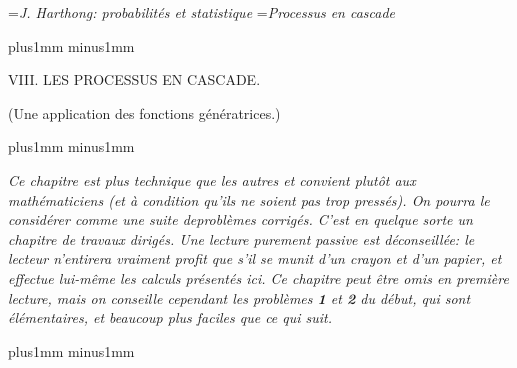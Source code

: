 


\auteurcourant={\sl J. Harthong: probabilit\'es et statistique}
\titrecourant={\sl Processus en cascade}


\def\hfq{\hfill\quad}
\def\cc#1{\hfill#1\quad\hfill}
\def\tv{\vrule height 30pt depth 6pt width0.4pt}
\def\punkt{\vrule height0.4pt depth0pt width0.4pt}
\def\L{{\bb L}} 

\def\ara{\hskip-1.5pt}
\def\asa{\hskip-2pt}
\def\ata{\hskip-2.5pt}
\def\aua{\hskip-1pt}
\def\arb{\hskip1.5pt}
\def\asb{\hskip2pt}
\def\atb{\hskip2.5pt}
\def\aub{\hskip1pt}
\def\xsp{\hskip3pt plus3pt minus2pt} 

\null\vskip 10mm plus1mm minus1mm

\centerline {\tit VIII. LES PROCESSUS EN CASCADE.} 
\medskip 
\centerline {\tit (Une application des fonctions g\'en\'eratrices.)} 

\vskip10mm plus1mm minus1mm

{\narrower\eightpoint\sl Ce chapitre est plus technique que les autres 
et convient plut\^ot aux math\'e\-ma\-ti\-ciens (et \`a condition qu'ils ne
soient pas trop press\'es). On pourra le
consid\'erer comme une suite deprobl\`emes corrig\'es. C'est 
en quelque sorte un chapitre de travaux dirig\'es. Une lecture purement
passive est d\'econseill\'ee: le lecteur n'entirera vraiment profit que s'il  se munit d'un crayon et d'un papier, et 
effectue lui-m\^eme les
calculs pr\'esent\'es ici. 
\medskip 
Ce chapitre peut \^etre omis en premi\`ere lecture, mais on conseille
cependant les probl\`emes {\bf 1} et {\bf 2} du d\'ebut, qui sont
\'el\'ementaires,  et beaucoup plus faciles que ce qui suit. \par}

\vskip7mm plus1mm minus1mm

